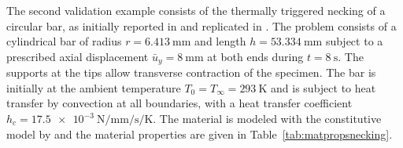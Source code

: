 The second validation example consists of the thermally triggered necking of a circular bar, as initially reported in \cite{simo_associative_1992} and replicated in \cite{danowski_computational_2014}.
The problem consists of a cylindrical bar of radius $r=\SI{6.413}{\milli\meter}$ and length $h=\SI{53.334}{\milli\meter}$ subject to a prescribed axial displacement $\bar{u}_{y}=\SI{8}{\milli\meter}$ at both ends during $t=\SI{8}{\second}$.
The supports at the tips allow transverse contraction of the specimen.
The bar is initially at the ambient temperature $T_{0}=T_{\infty}=\SI{293}{\kelvin}$ and is subject to heat transfer by convection at all boundaries, with a heat transfer coefficient $h_{c} = \SI{17.5e-3}{\newton\per\milli\meter\per\second\per\kelvin}$.
The material is modeled with the constitutive model by \cite{simo_associative_1992} and the material properties are given in Table~\ref{tab:matpropsnecking}.
%
